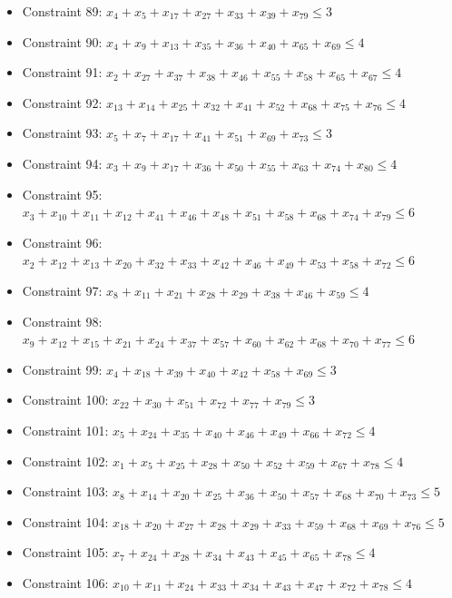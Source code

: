 \documentclass[11pt]{article}
\begin{document}
\begin{itemize}
\item Constraint 89: $x_{4} + x_{5} + x_{17} + x_{27} + x_{33} + x_{39} + x_{79} \le 3$
\item Constraint 90: $x_{4} + x_{9} + x_{13} + x_{35} + x_{36} + x_{40} + x_{65} + x_{69} \le 4$
\item Constraint 91: $x_{2} + x_{27} + x_{37} + x_{38} + x_{46} + x_{55} + x_{58} + x_{65} + x_{67} \le 4$
\item Constraint 92: $x_{13} + x_{14} + x_{25} + x_{32} + x_{41} + x_{52} + x_{68} + x_{75} + x_{76} \le 4$
\item Constraint 93: $x_{5} + x_{7} + x_{17} + x_{41} + x_{51} + x_{69} + x_{73} \le 3$
\item Constraint 94: $x_{3} + x_{9} + x_{17} + x_{36} + x_{50} + x_{55} + x_{63} + x_{74} + x_{80} \le 4$
\item Constraint 95: $x_{3} + x_{10} + x_{11} + x_{12} + x_{41} + x_{46} + x_{48} + x_{51} + x_{58} + x_{68} + x_{74} + x_{79} \le 6$
\item Constraint 96: $x_{2} + x_{12} + x_{13} + x_{20} + x_{32} + x_{33} + x_{42} + x_{46} + x_{49} + x_{53} + x_{58} + x_{72} \le 6$
\item Constraint 97: $x_{8} + x_{11} + x_{21} + x_{28} + x_{29} + x_{38} + x_{46} + x_{59} \le 4$
\item Constraint 98: $x_{9} + x_{12} + x_{15} + x_{21} + x_{24} + x_{37} + x_{57} + x_{60} + x_{62} + x_{68} + x_{70} + x_{77} \le 6$
\item Constraint 99: $x_{4} + x_{18} + x_{39} + x_{40} + x_{42} + x_{58} + x_{69} \le 3$
\item Constraint 100: $x_{22} + x_{30} + x_{51} + x_{72} + x_{77} + x_{79} \le 3$
\item Constraint 101: $x_{5} + x_{24} + x_{35} + x_{40} + x_{46} + x_{49} + x_{66} + x_{72} \le 4$
\item Constraint 102: $x_{1} + x_{5} + x_{25} + x_{28} + x_{50} + x_{52} + x_{59} + x_{67} + x_{78} \le 4$
\item Constraint 103: $x_{8} + x_{14} + x_{20} + x_{25} + x_{36} + x_{50} + x_{57} + x_{68} + x_{70} + x_{73} \le 5$
\item Constraint 104: $x_{18} + x_{20} + x_{27} + x_{28} + x_{29} + x_{33} + x_{59} + x_{68} + x_{69} + x_{76} \le 5$
\item Constraint 105: $x_{7} + x_{24} + x_{28} + x_{34} + x_{43} + x_{45} + x_{65} + x_{78} \le 4$
\item Constraint 106: $x_{10} + x_{11} + x_{24} + x_{33} + x_{34} + x_{43} + x_{47} + x_{72} + x_{78} \le 4$

\end{itemize}
\end{document}
